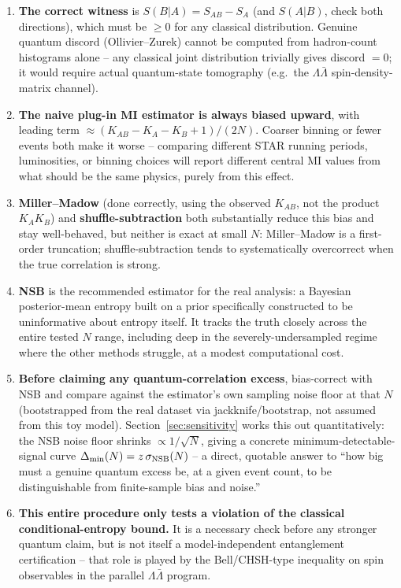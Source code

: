 \documentclass[11pt]{article}
\newcommand{\SBA}{S(B|A)}
\begin{document}
\begin{enumerate}

\item \textbf{The correct witness} is $\SBA=S_{AB}-S_A$ (and $S(A|B)$,
check both directions), which must be $\geq0$ for any classical
distribution. Genuine quantum discord (Ollivier--Zurek) cannot be
computed from hadron-count histograms alone -- any classical joint
distribution trivially gives discord $=0$; it would require actual
quantum-state tomography (e.g.\ the $\Lambda\bar\Lambda$
spin-density-matrix channel).

\item \textbf{The naive plug-in MI estimator is always biased upward},
with leading term $\approx(K_{AB}-K_A-K_B+1)/(2N)$. Coarser binning or
fewer events both make it worse -- comparing different STAR running
periods, luminosities, or binning choices will report different central
MI values from what should be the same physics, purely from this effect.

\item \textbf{Miller--Madow} (done correctly, using the observed
$K_{AB}$, not the product $K_AK_B$) and \textbf{shuffle-subtraction} both
substantially reduce this bias and stay well-behaved, but neither is exact
at small $N$: Miller--Madow is a first-order truncation;
shuffle-subtraction tends to systematically overcorrect when the true
correlation is strong.

\item \textbf{NSB} is the recommended estimator for the real analysis: a
Bayesian posterior-mean entropy built on a prior specifically constructed
to be uninformative about entropy itself. It tracks the truth closely
across the entire tested $N$ range, including deep in the
severely-undersampled regime where the other methods struggle, at a
modest computational cost.

\item \textbf{Before claiming any quantum-correlation excess}, bias-correct
with NSB and compare against the estimator's own sampling noise floor at
that $N$ (bootstrapped from the real dataset via jackknife/bootstrap, not
assumed from this toy model). Section~\ref{sec:sensitivity} works this out
quantitatively: the NSB noise floor shrinks $\propto 1/\sqrt{N}$, giving a
concrete minimum-detectable-signal curve
$\Delta_{\rm min}(N)=z\,\sigma_{\rm NSB}(N)$ -- a direct, quotable answer
to ``how big must a genuine quantum excess be, at a given event count, to
be distinguishable from finite-sample bias and noise.''

\item \textbf{This entire procedure only tests a violation of the
classical conditional-entropy bound.} It is a necessary check before any
stronger quantum claim, but is not itself a model-independent entanglement
certification -- that role is played by the Bell/CHSH-type inequality on
spin observables in the parallel $\Lambda\bar\Lambda$ program.

\end{enumerate}
\end{document}
